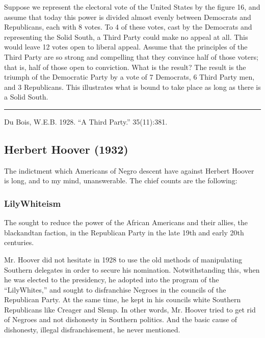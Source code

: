 \documentclass[letterpaper,10pt,english]{jupyterBook}
\begin{document}
\sphinxAtStartPar
Suppose we represent the electoral vote of the United States by the figure 16, and assume that today this power is divided almost evenly between Democrats and Republicans, each with 8 votes. To 4 of these votes, cast by the Democrats and representing the Solid South, a Third Party could make no appeal at all. This would leave 12 votes open to liberal appeal. Assume that the principles of the Third Party are so strong and compelling that they convince half of those voters; that is, half of those open to conviction. What is the result? The result is the triumph of the Democratic Party by a vote of 7 Democrats, 6 Third Party men, and 3 Republicans. This illustrates what is bound to take place as long as there is a Solid South.


\bigskip\hrule\bigskip


\sphinxAtStartPar
{} Du Bois, W.E.B. 1928. “A Third Party.”   35(11):381.


\subsection{Herbert Hoover (1932)}
\label{\detokenize{Volumes/39/11/herbert_hoover:herbert-hoover-1932}}\label{\detokenize{Volumes/39/11/herbert_hoover::doc}}
\sphinxAtStartPar
The indictment which Americans of Negro descent have against Herbert Hoover is long, and to my mind, unanswerable. The chief counts are the following:


\subsubsection{Lily\sphinxhyphen{}White\sphinxhyphen{}ism}
\label{\detokenize{Volumes/39/11/herbert_hoover:lily-white-ism}}
\begin{sphinxShadowBox}
\sphinxstylesidebartitle{}

\sphinxAtStartPar
The  sought to reduce the power of the African Americans and their allies, the  black\sphinxhyphen{}and\sphinxhyphen{}tan faction, in the Republican Party in the late 19th and early 20th centuries.
\end{sphinxShadowBox}

\sphinxAtStartPar
Mr. Hoover did not hesitate in 1928 to use the old methods of manipulating Southern delegates in order to secure his nomination. Notwithstanding this, when he was elected to the presidency, he adopted into the program of the “Lily\sphinxhyphen{}Whites,” and sought to disfranchise Negroes in the councils of the Republican Party. At the same time, he kept in his councils white Southern Republicans like Creager and Slemp. In other words, Mr. Hoover tried to get rid of Negroes and not dishonesty in Southern politics. And the basic cause of dishonesty, illegal disfranchisement, he never mentioned.
\end{document}
